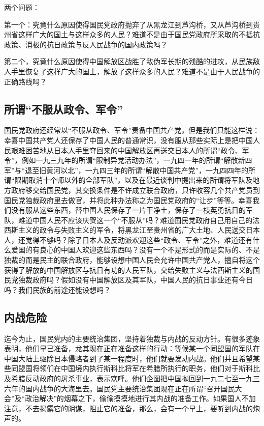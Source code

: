 两个问题：

第一个：究竟什么原因使得国民党政府抛弃了从黑龙江到芦沟桥，又从芦沟桥到贵州省这样广大的国土与这样众多的人民？难道不是由于国民党政府所采取的不抵抗政策、消极的抗日政策与反人民战争的国内政策吗？

第二个，究竟什么原因使得中国解放区战胜了敌伪军长期的残酷的进攻，从民族敌人手里恢复了这样广大的国土，解放了这样众多的人民？难道不是由于人民战争的正确路线吗？

\subsection{所谓“不服从政令、军令”}

国民党政府还经常以“不服从政令、军令”责备中国共产党，但是我们只能这样说：幸喜中国共产党人还保存了中国人民的普通常识，没有服从那些实际上是把中国人民艰难困苦地从日本人手里夺回来的中国解放区再送交日本人的所谓“政令、军令”，例如一九三九年的所谓“限制异党活动办法”，一九四一年的所谓“解散新四军”与“退至旧黄河以北”，一九四三年的所谓“解散中国共产党”，一九四四年的所谓“限期取消十个师以外的全部军队”，以及在最近谈判中提出来的所谓将军队及地方政府移交给国民党，其交换条件是不许成立联合政府，只许收容几个共产党员到国民党独裁政府里去做官，并将此种办法称之为国民党政府的“让步”等等。幸喜我们没有服从这些东西，替中国人民保存了一片干净土，保存了一枝英勇抗日的军队，难道中国人民不应该庆贺这一个“不服从”吗？难道国民党政府自己用自己的法西斯主义的政令与失败主义的军令，将黑龙江至贵州省的广大土地、人民送交日本人，还觉得不够吗？除了日本人及反动派欢迎这些“政令、军令”之外，难道还有什么爱国的有良心的中国人欢迎这些东西吗？没有一个不是形式的而是实际的、不是独裁的而是民主的联合政府，能够设想中国人民会允许中国共产党人，擅自将这个获得了解放的中国解放区与抗日有功的人民军队，交给失败主义与法西斯主义的国民党独裁政府吗？假如没有中国解放区及其军队，中国人民的抗日事业还有今日吗？我们民族的前途还能设想吗？

\subsection{内战危险}

迄今为止，国民党内的主要统治集团，坚持着独裁与内战的反动方针。有很多迹象表明，他们早已准备，龙其现在正在准备这样的行动：等候某一个同盟国的军队在中国大陆上驱除日本侵略者到了某一程度时，他们就要发动内战。他们并且希望某些同盟国将领们在中国境内执行斯科比将军在希腊所执行的职务，他们对于斯科比及希腊反动政府的屠杀事业，表示欢呼。他们企图把中国抛回到一九二七至一九三六年的国内战争的大海里去。国民党主要统治集团现在正在所谓“召开国民大会”及“政治解决”的烟幕之下，偷偷摸摸地进行其内战的准备工作。如果国人不加注意，不去揭露它的阴谋，阻止它的准备，那么，会有一个早上，要听到内战的炮声的。

